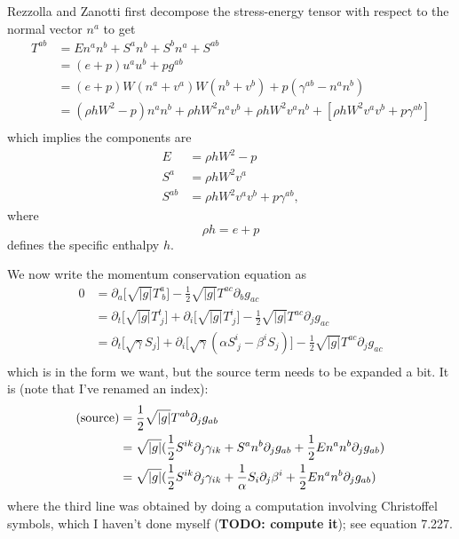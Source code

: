 \documentclass[12pt]{article}
\numberwithin{equation}{section}
\begin{document}
Rezzolla and Zanotti \cite{RezzollaZanotti} first decompose the stress-energy tensor with respect to the normal vector $n^a$ to get
\begin{equation}
\begin{aligned}
T^{ab} &= E n^a n^b + S^a n^b + S^b n^a + S^{ab} \\
&= (e+p) u^a u^b + p g^{ab} \\
&= (e+p) W (n^a + v^a) W (n^b + v^b) + p (\gamma^{ab} - n^a n^b) \\
&= (\rho h W^2 - p) n^a n^b + \rho h W^2 n^a v^b + \rho h W^2 v^a n^b + [\rho h W^2 v^a v^b + p \gamma^{ab}] \\
\end{aligned}
\end{equation}
which implies the components are
\begin{equation}
\begin{aligned}
E &= \rho h W^2 - p \\
S^{a} &= \rho h W^2 v^a \\
S^{ab} &= \rho h W^2 v^a v^b + p \gamma^{ab},
\end{aligned}
\end{equation}
where
\begin{equation}
\rho h = e + p
\end{equation}
defines the specific enthalpy $h$.

We now write the momentum conservation equation as
\begin{equation}
\begin{aligned}
0 &= \partial_a \big[ \sqrt{|g|} T^{a}_{~b} \big] - \frac{1}{2} \sqrt{|g|} T^{ac} \partial_{b} g_{ac} \\
&= \partial_t \big[ \sqrt{|g|} T^{t}_{~j} \big] + \partial_i \big[ \sqrt{|g|} T^{i}_{~j} \big] - \frac{1}{2} \sqrt{|g|} T^{ac} \partial_{j} g_{ac} \\
&= \partial_t \big[ \sqrt{\gamma} S_j \big] + \partial_i \big[ \sqrt{\gamma} (\alpha S^{i}_{~j} - \beta^{i} S_j) \big] - \frac{1}{2} \sqrt{|g|} T^{ac} \partial_{j} g_{ac} \\
\end{aligned}
\end{equation}
which is in the form we want, but the source term needs to be expanded a bit.
It is (note that I've renamed an index):
\begin{equation}
\begin{aligned}
(\textnormal{source}) &= \frac{1}{2} \sqrt{|g|} T^{ab} \partial_{j} g_{ab} \\
&= \sqrt{|g|} (\frac{1}{2} S^{ik} \partial_{j} \gamma_{ik} + S^a n^b \partial_{j} g_{ab} + \frac{1}{2} E n^a n^b \partial_{j} g_{ab}) \\
&= \sqrt{|g|} (\frac{1}{2} S^{ik} \partial_{j} \gamma_{ik} + \frac{1}{\alpha} S_i \partial_{j} \beta^i + \frac{1}{2} E n^a n^b \partial_{j} g_{ab}) \\
\end{aligned}
\end{equation}
where the third line was obtained by doing a computation involving Christoffel symbols, which I haven't done myself (\textbf{TODO: compute it}); see \cite{RezzollaZanotti} equation 7.227.
\end{document}
